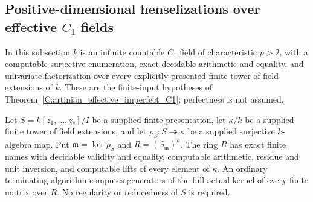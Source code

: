 \subsection{Positive-dimensional henselizations over effective $C_1$ fields}
\label{C:C1-henselizations-subsection}

In this subsection $k$ is an infinite countable $C_1$ field
of characteristic $p>2$, with a computable surjective
enumeration, exact decidable arithmetic and equality,
and univariate factorization over every explicitly
presented finite tower of field extensions of $k$.
These are the finite-input hypotheses of
Theorem~\ref{C:artinian_effective_imperfect_C1};
perfectness is not assumed.

\begin{lemma}
\label{C:C1-henselization-access}
Let $S=k[z_1,\ldots,z_s]/I$ be a supplied finite
presentation, let $\kappa/k$ be a supplied finite
tower of field extensions, and let
$\rho_S:S\twoheadrightarrow\kappa$ be a supplied
surjective $k$-algebra map.  Put
$\mathfrak m=\ker\rho_S$ and $R=(S_{\mathfrak m})^h$.
The ring $R$ has exact finite names with decidable
validity and equality, computable arithmetic,
residue and unit inversion, and computable lifts
of every element of $\kappa$.
An ordinary terminating algorithm computes generators
of the full actual kernel of every finite matrix
over $R$.  No regularity or reducedness of $S$
is required.
\end{lemma}
